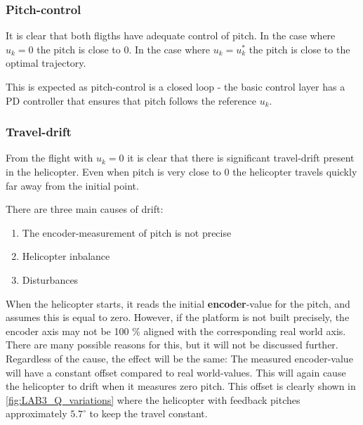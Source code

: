 \documentclass[../main.tex]{subfiles}
\begin{document}
\subsubsection{Pitch-control}
It is clear that both fligths have adequate control of pitch. In the case where $u_k = 0$ the pitch is close to $0$. In the case where $u_k = u_k^*$ the pitch is close to the optimal trajectory.

This is expected as pitch-control is a closed loop - the basic control layer has a PD controller that ensures that pitch follows the reference $u_k$.

\subsubsection{Travel-drift}\label{kap:LAB2_travel_drift_causes}
From the flight with $u_k = 0$ it is clear that there is significant travel-drift present in the helicopter. Even when pitch is very close to $0$ the helicopter travels quickly far away from the initial point.

There are three main causes of drift:
\begin{enumerate}
	\item The encoder-measurement of pitch is not precise
	\item Helicopter inbalance
	\item Disturbances
\end{enumerate}

When the helicopter starts, it reads the initial \textbf{encoder}-value for the pitch, and assumes this is equal to zero. However, if the platform is not built precisely, the encoder axis may not be 100 \% aligned with the corresponding real world axis. There are many possible reasons for this, but it will not be discussed further. Regardless of the cause, the effect will be the same: The measured encoder-value will have a constant offset compared to real world-values. This will again cause the helicopter to drift when it measures zero pitch. This offset is clearly shown in \cref{fig:LAB3_Q_variations} where the helicopter with feedback pitches approximately $5.7 ^{\circ} $ to keep the travel constant.

\end{document}
